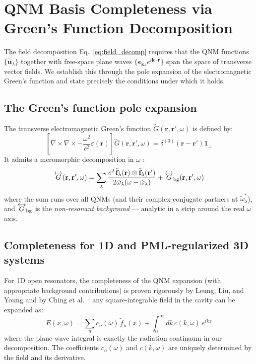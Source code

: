 \documentclass[12pt]{article}
\newcommand{\tf}{\tilde{\mathbf{f}}}
\newcommand{\tu}{\tilde{\mathbf{u}}}
\newcommand{\tomega}{\tilde{\omega}}
\begin{document}
\section{QNM Basis Completeness via Green's Function Decomposition}
\label{app:completeness}

The field decomposition Eq.~\eqref{eq:field_decomp} requires that the
QNM functions $\{\tu_\lambda\}$ together with free-space plane waves
$\{\boldsymbol{\epsilon}_{\mathbf{k}s}e^{i\mathbf{k}\cdot\mathbf{r}}\}$
span the space of transverse vector fields.  We establish this through
the pole expansion of the electromagnetic Green's function and state
precisely the conditions under which it holds.

\subsection*{The Green's function pole expansion}

The transverse electromagnetic Green's function
$\overleftrightarrow{G}(\mathbf{r},\mathbf{r}',\omega)$ is defined by:
\begin{equation}
  \left[\nabla\times\nabla\times
  -\frac{\omega^2}{c^2}\varepsilon(\mathbf{r})\right]
  \overleftrightarrow{G}(\mathbf{r},\mathbf{r}',\omega)
  = \delta^{(3)}(\mathbf{r}-\mathbf{r}')\mathbf{1}_\perp
  \label{eq:green_eqn}
\end{equation}
It admits a meromorphic decomposition in $\omega$
\cite{Lalanne2018,Sauvan2013}:
\begin{equation}
  \overleftrightarrow{G}(\mathbf{r},\mathbf{r}',\omega) =
  \sum_\lambda\frac{c^2\,\tf_\lambda(\mathbf{r})\otimes\tf_\lambda(\mathbf{r}')}
  {2\tomega_\lambda(\omega-\tomega_\lambda)}
  + \overleftrightarrow{G}_{\rm bg}(\mathbf{r},\mathbf{r}',\omega)
  \label{eq:green_poles}
\end{equation}
where the sum runs over all QNMs (and their complex-conjugate partners at
$\tomega_\lambda^*$), and $\overleftrightarrow{G}_{\rm bg}$ is the
\emph{non-resonant background} --- analytic in a strip around the real
$\omega$ axis.

\subsection*{Completeness for 1D and PML-regularized 3D systems}

For 1D open resonators, the completeness of the QNM expansion
(with appropriate background contributions) is proven rigorously by
Leung, Liu, and Young \cite{Leung1994} and by Ching et al.\ \cite{Ching1998}:
any square-integrable field in the cavity can be expanded as:
\begin{equation}
  E(x,\omega) = \sum_n c_n(\omega)\,\tilde{f}_n(x)
  + \int_0^\infty dk\, c(k,\omega)\,e^{ikx}
  \label{eq:1D_completeness}
\end{equation}
where the plane-wave integral is exactly the radiation continuum in our
decomposition.  The coefficients $c_n(\omega)$ and $c(k,\omega)$ are
uniquely determined by the field and its derivative.
\end{document}
